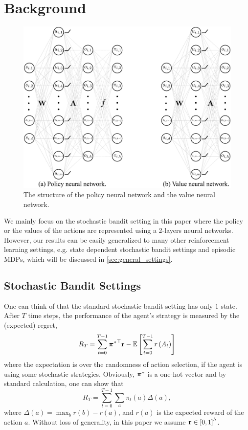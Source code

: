 \section{Background}
\label{sec:background}

\begin{figure}[t]
	\begin{center}
		\centerline{\includegraphics[width=0.6\columnwidth]{nn_policy_value_vertical.pdf}}
		\caption{The structure of the policy neural network and the value neural network.}
		\label{fig:nn_policy_value}
	\end{center}
	\vskip -0.2in
\end{figure}

We mainly focus on the stochastic bandit setting in this paper where the policy or the values of the actions are represented using a 2-layers neural networks.  
However, our results can be easily generalized to many other reinforcement learning settings, e.g. state dependent stochastic bandit settings and episodic MDPs, which will be discussed in \cref{sec:general_settings}.

\subsection{Stochastic Bandit Settings}
\label{subsec:settings}

One can think of that the standard stochastic bandit setting has only $1$ state.  
After $T$ time steps, the performance of the agent's strategy is measured by the (expected) regret,
\begin{equation}
\label{eq:expected_regret}
R_T = \sum\limits_{t=0}^{T-1}{{{\boldsymbol{\pi}}^*}^\top {\mathbf{r}}} - {\mathbb{E}} \left[ \sum\limits_{t=0}^{T-1}{  r\left(A_t\right)  } \right] 
\end{equation}
where the expectation is over the randomness of action selection, if the agent is using some stochastic strategies.
Obviously, ${\boldsymbol{\pi}}^*$ is a one-hot vector and by standard calculation, one can show that
\[
R_T = \sum_{t=0}^{T-1} \sum_a \pi_t(a) \Delta(a),
\]
where $\Delta(a) = \max_b r(b)- r(a)$, and  $r(a)$ is the expected reward of the action $a$.
Without loss of generality, in this paper we assume ${\mathbf{r}} \in \left[ 0, 1 \right]^h$.

